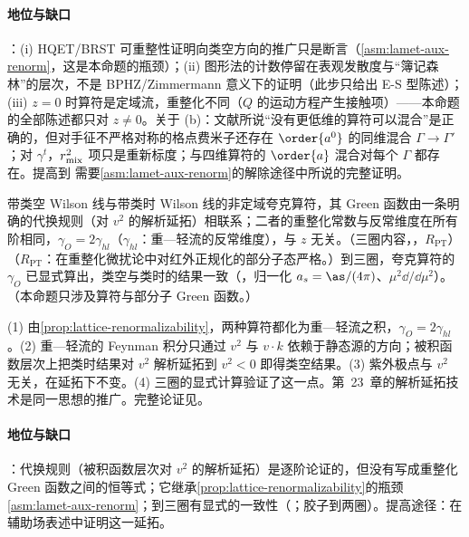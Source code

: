 \paragraph{地位与缺口}
\tagA：(i) HQET/BRST 可重整性证明向类空方向的推广只是断言（\cref{asm:lamet-aux-renorm}，这是本命题的瓶颈）；(ii) 图形法的计数停留在表观发散度与“簿记森林”的层次，不是 BPHZ/Zimmermann 意义下的证明（此步只给出 E-S 型陈述）；(iii) $z=0$ 时算符是定域流，重整化不同（$Q$ 的运动方程产生接触项）——本命题的全部陈述都只对 $z\neq0$。关于 (b)：文献\cite{Ji:2017oey}所说“没有更低维的算符可以混合”是正确的，但对手征不严格对称的格点费米子还存在 $\order{a^0}$ 的同维混合 $\Gamma\to\Gamma'$\cite{Green:2017xeu,Constantinou:2017sej,Chen:2017mie}；对 $\gamma^t$，$r_{\rm mix}^2$ 项只是重新标度；与四维算符的 $\order{a}$ 混合对每个 $\Gamma$ 都存在。提高到 \tagR 需要\cref{asm:lamet-aux-renorm}的解除途径中所说的完整证明。

\begin{proposition}\label{prop:lamet-ad-spacelike}
带类空 Wilson 线与带类时 Wilson 线的非定域夸克算符，其 Green 函数由一条明确的代换规则（对 $v^2$ 的解析延拓）相联系；二者的重整化常数与反常维度在所有阶相同，$\gamma_O=2\gamma_{hl}$（$\gamma_{hl}$：重—轻流的反常维度），与 $z$ 无关。（三圈内容，\tagR，$R_{\mathrm{PT}}$）（$R_{\mathrm{PT}}$：在重整化微扰论中对红外正规化的部分子态严格。）到三圈，夸克算符的 $\gamma_O$ 已显式算出，类空与类时的结果一致（\cite[附录~A]{Braun:2020ymy}，归一化 $a_s=\as/(4\pi)$、$\mu^2\dd/\dd\mu^2$）。
（本命题只涉及算符与部分子 Green 函数。）
\end{proposition}

\begin{proofsketch}
(1) 由\cref{prop:lattice-renormalizability}，两种算符都化为重—轻流之积，$\gamma_O=2\gamma_{hl}$。(2) 重—轻流的 Feynman 积分只通过 $v^2$ 与 $v\cdot k$ 依赖于静态源的方向；被积函数层次上把类时结果对 $v^2$ 解析延拓到 $v^2<0$ 即得类空结果\cite{Braun:2020ymy}。(3) 紫外极点与 $v^2$ 无关，在延拓下不变。(4) 三圈的显式计算验证了这一点。第~23~章的解析延拓技术是同一思想的推广。完整论证见\cite{Braun:2020ymy}。
\end{proofsketch}

\paragraph{地位与缺口}
\tagA：代换规则（被积函数层次对 $v^2$ 的解析延拓）是逐阶论证的，但没有写成重整化 Green 函数之间的恒等式；它继承\cref{prop:lattice-renormalizability}的瓶颈\cref{asm:lamet-aux-renorm}；到三圈有显式的一致性（\cite[附录~A]{Braun:2020ymy}；胶子到两圈）。提高途径：在辅助场表述中证明这一延拓。

